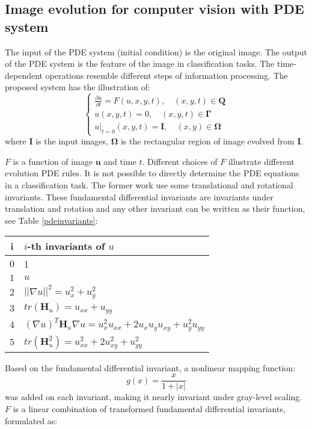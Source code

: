 \documentclass{amsart}
\theoremstyle{definition}
\theoremstyle{remark}
\numberwithin{equation}{section}
\begin{document}
\subsection{Image evolution for computer vision with PDE system}
The input of the PDE system (initial condition) is  the original image. 
The output of the PDE system is the feature of the image in classification tasks.
The time-dependent operations resemble different steps of information processing.
The proposed system has the illustration of:
\begin{equation}
 \left\{
  \begin{array}{lr}
    \frac{\partial u}{\partial t} = F(u, x, y, t), \quad (x, y, t) \in \mathbf{Q}\\
	u(x, y, t) = 0, \quad (x, y, t) \in  \mathbf{\Gamma} \\
	u|_{t=0}(x, y, t) = \mathbf{I}, \quad (x, y)\in \mathbf{\Omega}
  \end{array}
\right.
\end{equation}
where $\mathbf{I}$ is the input images, $\mathbf{\Omega}$ is the rectangular region of image evolved from $\mathbf{I}$.


$F$ is a function of image $\mathbf{u}$ and time $t$. Different choices of $F$ illustrate different evolution PDE rules. 
It is not possible to directly determine the PDE equations in a classification task.
The former work use some translational and rotational invariants.
These fundamental differential invariants are invariants under translation and rotation and any other invariant can be written as their function, see Table \ref{pdeinvariants}:

\begin{center}
\label{pdeinvariants}
\begin{tabular}{cl}
\hline
i    & $i$-th invariants of $u$ \\
\hline
$0$  &  1   \\
$1$  &  $u$   \\
$2$  &  $|| \nabla u ||^2  = u_x^2 + u_y^2  $\\
$3$  &  $tr(\mathbf{H}_u) = u_{xx} + u_{yy} $  \\
$4$  &  $(\nabla u) ^T\mathbf{H}_u\nabla u= u_x^2u_{xx} + 2u_xu_yu_{xy} + u_y^2u_{yy} $\\
$5$  &  $tr(\mathbf{H}_u^2) = u_{xx}^2 + 2u_{xy}^2 + u_{yy}^2$   \\
\hline
\end{tabular}
\end{center}
Based on the fundamental differential invariant, a nonlinear mapping function:
\begin{equation}
g(x) = \frac{x}{1 + |x|}
\end{equation}
was added on each invariant, making it nearly invariant under gray-level scaling.
$F$ is a linear combination of transformed fundamental differential invariants, formulated as:
\end{document}
